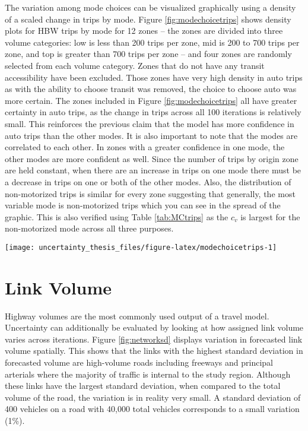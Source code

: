 \documentclass[fancy, masters, twoside]{byuthesis}
\begin{document}
The variation among mode choices can be visualized graphically using a density of a scaled change in trips by mode. Figure \ref{fig:modechoicetrips} shows density plots for HBW trips by mode for 12 zones -- the zones are divided into three volume categories: low is less than 200 trips per zone, mid is 200 to 700 trips per zone, and top is greater than 700 trips per zone -- and four zones are randomly selected from each volume category. Zones that do not have any transit accessibility have been excluded. Those zones have very high density in auto trips as with the ability to choose transit was removed, the choice to choose auto was more certain. The zones included in Figure \ref{fig:modechoicetrips} all have greater certainty in auto trips, as the change in trips across all 100 iterations is relatively small. This reinforces the previous claim that the model has more confidence in auto trips than the other modes. It is also important to note that the modes are correlated to each other. In zones with a greater confidence in one mode, the other modes are more confident as well. Since the number of trips by origin zone are held constant, when there are an increase in trips on one mode there must be a decrease in trips on one or both of the other modes. Also, the distribution of non-motorized trips is similar for every zone suggesting that generally, the most variable mode is non-motorized trips which you can see in the spread of the graphic. This is also verified using Table \ref{tab:MCtrips} as the \(c_v\) is largest for the non-motorized mode across all three purposes.

\begin{sidewaysfigure}

{\centering \texttt{[image: uncertainty\_thesis\_files/figure-latex/modechoicetrips-1]} 

}

\caption{Trip density for coefficient of variation by mode for HBW trips.}\label{fig:modechoicetrips}
\end{sidewaysfigure}

\hypertarget{link-volume}{%
\section{Link Volume}\label{link-volume}}

Highway volumes are the most commonly used output of a travel model. Uncertainty can additionally be evaluated by looking at how assigned link volume varies across iterations. Figure \ref{fig:networksd} displays variation in forecasted link volume spatially. This shows that the links with the highest standard deviation in forecasted volume are high-volume roads including freeways and principal arterials where the majority of traffic is internal to the study region. Although these links have the largest standard deviation, when compared to the total volume of the road, the variation is in reality very small. A standard deviation of 400 vehicles on a road with 40,000 total vehicles corresponds to a small variation (1\%).
\end{document}
